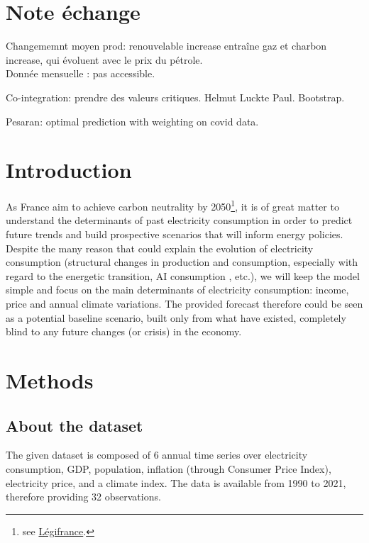 \section{Note échange}
\label{theorie}
Changememnt moyen prod: renouvelable increase entraîne gaz et charbon increase, qui évoluent avec le prix du pétrole. \\

Donnée mensuelle : pas accessible. 

Co-integration: prendre des valeurs critiques. Helmut Luckte Paul. Bootstrap. 

Pesaran: optimal prediction with weighting on covid data.
 

\newpage

\section{Introduction}
As France aim to achieve carbon neutrality by 2050\footnote{see \href{https://www.legifrance.gouv.fr/jorf/id/JORFTEXT000041814459}{Légifrance}.}, it is of great matter to understand the determinants of past electricity consumption in order to predict future trends and build prospective scenarios that will inform energy policies. Despite the many reason that could explain the evolution of electricity consumption (structural changes in production and consumption, especially with regard to the energetic transition, AI consumption \cite{de2023growing}, etc.), we will keep the model simple and focus on the main determinants of electricity consumption: income, price and annual climate variations. The provided forecast therefore could be seen as a potential baseline scenario, built only from what have existed, completely blind to any future changes (or crisis) in the economy.

\section{Methods}

\subsection{About the dataset}

The given dataset is composed of 6 annual time series over electricity consumption, GDP, population, inflation (through Consumer Price Index), electricity price, and a climate index. The data is available from 1990 to 2021, therefore providing 32 observations. 

